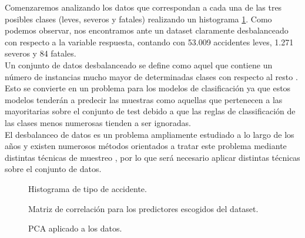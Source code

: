 \begin{enumerate}
\begin{enumerate}
                    Comenzaremos analizando los datos que correspondan a cada una de las tres posibles clases (leves, severos y fatales) realizando un histograma \ref{CasualtyClassImage}. Como podemos observar, nos encontramos ante un dataset claramente desbalanceado con respecto a la variable respuesta, contando con 53.009 accidentes leves, 1.271 severos y 84 fatales.\\

                    Un conjunto de datos desbalanceado se define como aquel que contiene un número de instancias mucho mayor de determinadas clases con respecto al resto \cite{WhyImbalancedDataIsAProblem}. Esto se convierte en un problema para los modelos de clasificación ya que estos modelos tenderán a predecir las muestras como aquellas que pertenecen a las mayoritarias sobre el conjunto de test debido a que las reglas de classificación de las clases menos numerosas tienden a ser ignoradas.\\

                    El desbalanceo de datos es un problema ampliamente estudiado a lo largo de los años y existen numerosos métodos orientados a tratar este problema mediante distintas técnicas de muestreo \cite{ImbalancedDataReview}, por lo que será necesario aplicar distintas técnicas sobre el conjunto de datos.


                    \begin{figure}[H]
                        \centering
                        
                        \caption{Histograma de tipo de accidente.}
                        \label{CasualtyClassImage}
                     \end{figure}


                    \begin{figure}[H]
                        \centering
                        
                        \caption{Matriz de correlación para los predictores escogidos del dataset.}
                        \label{CorrelationMatrixImage}
                     \end{figure}

                    \begin{figure}[H]
                        \centering
                        
                        \caption{PCA aplicado a los datos.}
                        \label{PCAImage}
                     \end{figure}


\end{enumerate}
\end{enumerate}

